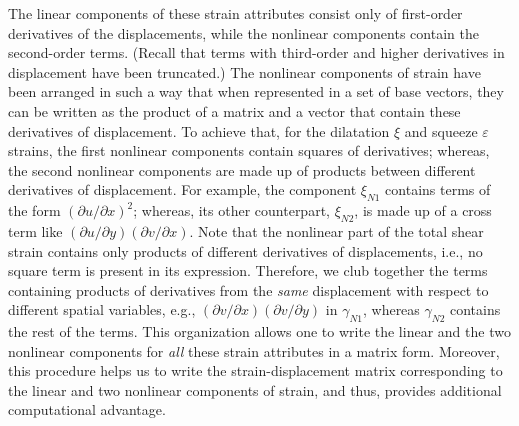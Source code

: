 The linear components of these strain attributes consist only of first-order derivatives of the displacements, while the nonlinear components contain the second-order terms. (Recall that terms with third-order and higher derivatives in displacement have been truncated.) The nonlinear components of strain have been arranged in such a way that when represented in a set of base vectors, they can be written as the product of a matrix and a vector that contain these derivatives of displacement.  To achieve that, for the dilatation $\xi$ and squeeze $\varepsilon$ strains, the first nonlinear components contain squares of derivatives; whereas, the second nonlinear components are made up of products between different derivatives of displacement. For example, the component $\xi_{N1}$ contains terms of the form $(\partial u / \partial x )^2$; whereas, its other counterpart, $\xi_{N2}$, is made up of a cross term like $(\partial u / \partial y) (\partial v / \partial x)$. Note that the nonlinear part of the total shear strain contains only products of different derivatives of displacements, i.e., no square term is present in its expression. Therefore, we club together the terms containing products of derivatives from the \textit{same\/} displacement with respect to different spatial variables, e.g., $(\partial v / \partial x )( \partial v / \partial y )$ in $\gamma_{N1}$, whereas $\gamma_{N2}$ contains the rest of the terms. This organization allows one to write the linear and the two nonlinear components for \textit{all\/} these strain attributes in a matrix form.  Moreover, this procedure helps us to write the strain-displacement matrix corresponding to the linear and two nonlinear components of strain, and thus, provides additional computational advantage.

